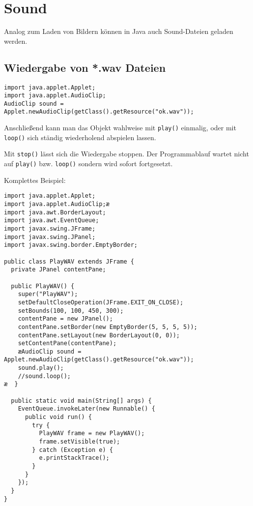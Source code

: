 \chapter{Sound}
\renewcommand{\chaptertitle}{Sound}

\lehead[]{\normalfont\sffamily\hspace*{-2.00cm}\textcolor{white}{\colorbox{lightblue}{\makebox[1.60cm][r]{\thechapter}}}\hspace{0.17cm}\textcolor{lightblue}{\chaptertitle}}
\rohead[]{\textcolor{lightblue}{\chaptertitle}\normalfont\sffamily\hspace*{0.17cm}\textcolor{white}{\colorbox{lightblue}{\makebox[1.60cm][l]{\thechapter}}}\hspace{-2.00cm}}
\rehead[]{\textcolor{lightblue}{AvHG, Inf, My}}
\lohead[]{\textcolor{lightblue}{AvHG, Inf, My}}

\lstset{style=myJava}

Analog zum Laden von Bildern können in Java auch Sound-Dateien geladen werden.

\section{Wiedergabe von *.wav Dateien}

\begin{lstlisting}
import java.applet.Applet;
import java.applet.AudioClip;
AudioClip sound = Applet.newAudioClip(getClass().getResource("ok.wav"));
\end{lstlisting}

Anschließend kann man das  Objekt wahlweise mit
\lstinline|play()| einmalig, oder mit \lstinline|loop()| sich ständig
wiederholend abspielen lassen. 

Mit \lstinline|stop()| lässt sich die Wiedergabe stoppen. Der Programmablauf
wartet nicht auf \lstinline|play()| bzw. \lstinline|loop()| sondern wird sofort
fortgesetzt.

Komplettes Beispiel:

\begin{lstlisting}
import java.applet.Applet;
import java.applet.AudioClip;æ
import java.awt.BorderLayout;
import java.awt.EventQueue;
import javax.swing.JFrame;
import javax.swing.JPanel;
import javax.swing.border.EmptyBorder;

public class PlayWAV extends JFrame {
  private JPanel contentPane;

  public PlayWAV() {
    super("PlayWAV");
    setDefaultCloseOperation(JFrame.EXIT_ON_CLOSE);
    setBounds(100, 100, 450, 300);
    contentPane = new JPanel();
    contentPane.setBorder(new EmptyBorder(5, 5, 5, 5));
    contentPane.setLayout(new BorderLayout(0, 0));
    setContentPane(contentPane);
    æAudioClip sound = Applet.newAudioClip(getClass().getResource("ok.wav"));
    sound.play();
    //sound.loop();
æ  }

  public static void main(String[] args) {
    EventQueue.invokeLater(new Runnable() {
      public void run() {
        try {
          PlayWAV frame = new PlayWAV();
          frame.setVisible(true);
        } catch (Exception e) {
          e.printStackTrace();
        }
      }
    });
  }
}
\end{lstlisting}


